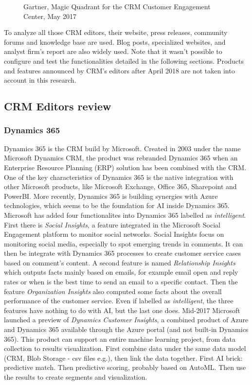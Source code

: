 \begin{figure}[!h]
\begin{minipage}[c]{0.49\linewidth}
        \caption[Magic Quadrant for the CRM Customer Engagement Center]{Gartner, Magic Quadrant for the CRM Customer Engagement Center, May 2017}
        \label{fig:magic-quadrant-customer-engagement}
    \end{minipage}
\end{figure}

To analyze all those CRM editors, their website, press releases, community forums and knowledge base are used. Blog posts, specialized websites, and analyst firm's report are also widely used. Note that it wasn't possible to configure and test the functionalities detailed in the following sections. Products and features announced by CRM's editors after April 2018 are not taken into account in this research.

\subsection{CRM Editors review}

\subsubsection*{Dynamics 365}
Dynamics 365 is the CRM build by Microsoft. Created in 2003 under the name Microsoft Dynamics CRM, the product was rebranded Dynamics 365 when an Enterprise Resource Planning (ERP) solution has been combined with the CRM. One of the key characteristics of Dynamics 365 is the native integration with other Microsoft products, like Microsoft Exchange, Office 365, Sharepoint and PowerBI. More recently, Dynamics 365 is building synergies with Azure technologies, which seems to be the foundation for AI inside Dynamics 365. Microsoft has added four functionalites into Dynamics 365 labelled as \textit{intelligent}. First there is \textit{Social Insights}, a feature integrated in the Microsoft Social Engagement platform to monitor social networks. Social Insights focus on monitoring social media, especially to spot emerging trends in comments. It can then be integrate with Dynamics 365 processes to create customer service cases based on comment's content. A second feature is named \textit{Relationship Insights} which outputs facts mainly based on emails, for example email open and reply rates or when is the best time to send an email to a specific contact. Then the feature \textit{Organization Insights} also computed some facts about the overall performance of the customer service. Even if labelled as \textit{intelligent}, the three features have nothing to do with AI, but the last one does. Mid-2017 Microsoft launched a preview of \textit{Dynamics Customer Insights}, a combined product of Azure and Dynamics 365 available through the Azure portal (and not built-in Dynamics 365). This product can support an entire machine learning project, from data collection to results visualization. First combine data under the same data model (CRM, Blob Storage - csv files e.g.), then link the data together. First AI brick: predictive match. Then predictive scoring, probably based on AutoML. Then use the results to create segments and visualization.

